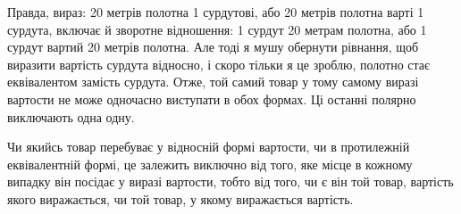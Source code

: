 Правда, вираз: 20 метрів полотна \deq{} 1 сурдутові, або 20 метрів
полотна варті 1 сурдута, включає й зворотне відношення:
1 сурдут \deq{} 20 метрам полотна, або 1 сурдут вартий 20 метрів
полотна. Але тоді я мушу обернути рівнання, щоб виразити вартість
сурдута відносно, і скоро тільки я це зроблю, полотно стає
еквівалентом замість сурдута. Отже, той самий товар у тому самому
виразі вартости не може одночасно виступати в обох формах.
Ці останні полярно виключають одна одну.

Чи якийсь товар перебуває у відносній формі вартости, чи в
протилежній еквівалентній формі, це залежить виключно від того,
яке місце в кожному випадку він посідає у виразі вартости, тобто
від того, чи є він той товар, вартість якого виражається, чи той
товар, у якому виражається вартість.

